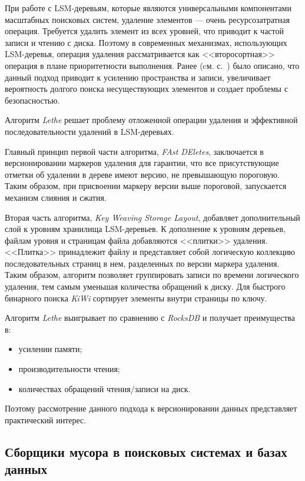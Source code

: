 При работе с LSM-деревьям, которые являются универсальными компонентами масштабных
поисковых систем, удаление элементов — очень ресурсозатратная операция. Требуется
удалить элемент из всех уровней, что приводит к частой записи и чтению с диска.
Поэтому в современных механизмах, использующих LSM-деревья, операция удаления
рассматривается как <<второсортная>> операция в плане приоритетности выполнения.
Ранее (cм. с.~\pageref{amplification}) было описано, что данный подход приводит к
усилению пространства и записи, увеличивает вероятность долгого поиска
несуществующих элементов и создает проблемы с безопасностью.

Алгоритм \textit{Lethe} \cite{Lethe:2020} решает проблему отложенной операции удаления и
эффективной последовательности удалений в LSM-деревьях. 

Главный принцип первой части алгоритма, \textit{FAst DEletes}, заключается в версионировании
маркеров удаления для гарантии, что все присутствующие отметки об удалении в
дереве имеют версию, не превышающую пороговую. Таким образом, при присвоении
маркеру версии выше пороговой, запускается механизм слияния и сжатия.

Вторая часть алгоритма, \textit{Key Weaving Storage Layout}, добавляет дополнительный
слой к уровням хранилища LSM-деревьев. К дополнение к уровням деревьев, файлам
уровня и страницам файла добавляются <<плитки>> удаления. <<Плитка>> принадлежит
файлу и представляет собой логическую коллекцию последовательных страниц в нем,
разделенных по версии маркера удаления. Таким образом, алгоритм позволяет
группировать записи по времени логического удаления, тем самым уменьшая количества
обращений к диску. Для быстрого бинарного поиска \textit{KiWi} сортирует элементы
внутри страницы по ключу.

Алгоритм \textit{Lethe} выигрывает по сравнению с \textit{RocksDB} и получает преимущества в:
\begin{itemize}
    \item усилении памяти;
    \item производительности чтения;
    \item количествах обращений чтения/записи на диск.
\end{itemize}

Поэтому рассмотрение данного подхода к версионировании данных представляет
практический интерес.

\subsection{Сборщики мусора в поисковых системах и базах данных}

